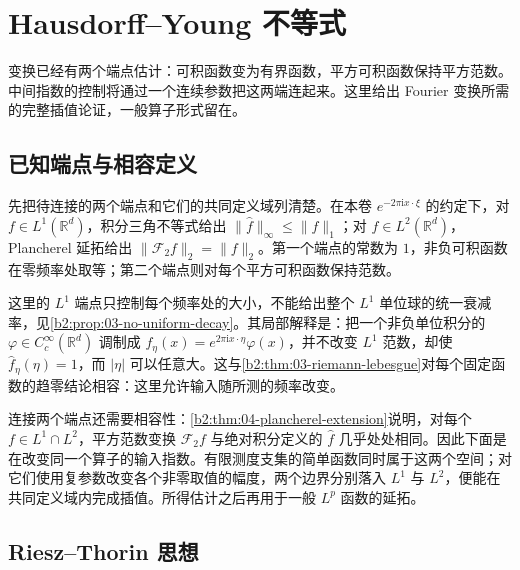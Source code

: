 \section{Hausdorff--Young 不等式}
\label{b2:sec:0402}

变换已经有两个端点估计：可积函数变为有界函数，平方可积函数保持平方范数。中间指数的控制将通过一个连续参数把这两端连起来。这里给出 Fourier 变换所需的完整插值论证，一般算子形式留在。

\subsection{已知端点与相容定义}
\label{b2:subsec:04-fourier-endpoints}
\label{b2:subsec:040201}
\label{b2:subsec:040202}

先把待连接的两个端点和它们的共同定义域列清楚。在本卷 \(e^{-2\pi\mathrm ix\cdot\xi}\) 的约定下，对 \(f\in L^1(\mathbb R^d)\)，积分三角不等式给出 \(\|\widehat f\|_\infty\leq\|f\|_1\)；对 \(f\in L^2(\mathbb R^d)\)，Plancherel 延拓给出 \(\|\mathcal F_2f\|_2=\|f\|_2\)。第一个端点的常数为 \(1\)，非负可积函数在零频率处取等；第二个端点则对每个平方可积函数保持范数。

\ProseParagraphBreak

这里的 \(L^1\) 端点只控制每个频率处的大小，不能给出整个 \(L^1\) 单位球的统一衰减率，见\cref{b2:prop:03-no-uniform-decay}。其局部解释是：把一个非负单位积分的 \(\varphi\in C_c^\infty(\mathbb R^d)\) 调制成 \(f_\eta(x)=e^{2\pi\mathrm ix\cdot\eta}\varphi(x)\)，并不改变 \(L^1\) 范数，却使 \(\widehat f_\eta(\eta)=1\)，而 \(|\eta|\) 可以任意大。这与\cref{b2:thm:03-riemann-lebesgue}对每个固定函数的趋零结论相容：这里允许输入随所测的频率改变。

\ProseParagraphBreak

连接两个端点还需要相容性：\cref{b2:thm:04-plancherel-extension}说明，对每个 \(f\in L^1\cap L^2\)，平方范数变换 \(\mathcal F_2f\) 与绝对积分定义的 \(\widehat f\) 几乎处处相同。因此下面是在改变同一个算子的输入指数。有限测度支集的简单函数同时属于这两个空间；对它们使用复参数改变各个非零取值的幅度，两个边界分别落入 \(L^1\) 与 \(L^2\)，便能在共同定义域内完成插值。所得估计之后再用于一般 \(L^p\) 函数的延拓。

\subsection{Riesz--Thorin 思想}
\label{b2:subsec:04-complex-interpolation}
\label{b2:subsec:040203}

